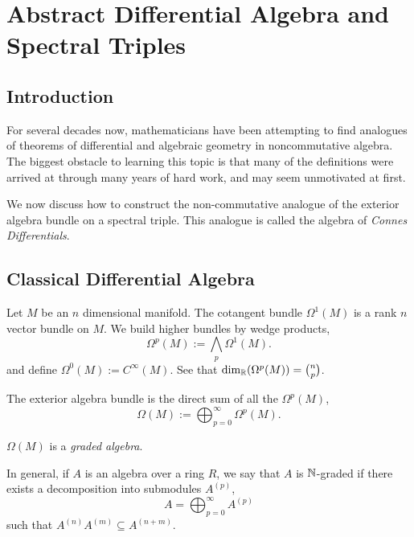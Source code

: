 
\chapter{Abstract Differential Algebra and Spectral Triples} %

\label{AbstractDifferentialAlgebra} %




\section{Introduction}
For several decades now, mathematicians have been attempting to find analogues
of theorems of differential and algebraic geometry in noncommutative 
algebra.
The biggest obstacle to learning this topic is that many of the definitions
were arrived at through many years of hard work, and may seem unmotivated at first.

We now discuss how to construct the non-commutative analogue of the exterior
algebra bundle on a spectral triple. This analogue is called the algebra of \emph{Connes Differentials}.

\section{Classical Differential Algebra}
Let $M$ be an $n$ dimensional manifold. The cotangent bundle $\Omega^1(M)$
is a rank $n$ vector bundle on $M$. We build higher bundles by wedge products,
\begin{equation*}
    \Omega^p(M) := \bigwedge_p \Omega^1(M).
\end{equation*}
and define $\Omega^0(M) := C^\infty(M)$. See that $\dim_{\mathbb{R}}(\Omega^p(M)) = \binom{n}{p}$.


The exterior algebra bundle is the direct sum of all the $\Omega^p(M)$,
\begin{equation*}
    \Omega(M) := \bigoplus_{p=0}^\infty \Omega^p(M).
\end{equation*}


$\Omega(M)$ is a \emph{graded algebra}.


In general, if $A$ is an algebra over a ring $R$, we say that $A$ is $\mathbb{N}$-graded
if there exists a decomposition into submodules $A^{(p)}$,
\begin{equation*}
    A = \bigoplus_{p=0}^\infty A^{(p)}
\end{equation*}
such that $A^{(n)}A^{(m)} \subseteq A^{(n+m)}$.

